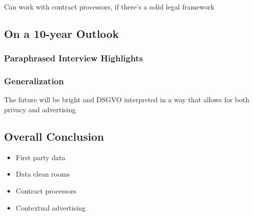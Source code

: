 Can work with contract processors, if there's a solid legal framework

\subsection{On a 10-year Outlook}

\subsubsection{Paraphrased Interview Highlights}

\subsubsection{Generalization}

The future will be bright and DSGVO interpreted in a way that allows for both privacy and advertising

\subsection{Overall Conclusion}

\begin{itemize}
 \item First party data 
 \item Data clean rooms
 \item Contract processors
 \item Contextual advertising
\end{itemize}
